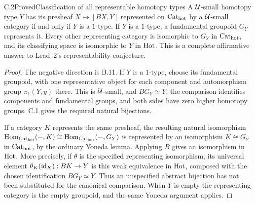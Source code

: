 \begin{claim}{C.2}{Proved}{Classification of all representable homotopy types}
A $\mathcal U$-small homotopy type $Y$ has its presheaf
$X\mapsto[BX,Y]$ represented on ${\mathrm{Cat}_{\mathrm{hot}}}$ by a $\mathcal U$-small category if
and only if $Y$ is a $1$-type.  If $Y$ is a $1$-type, a fundamental
groupoid $G_Y$ represents it.  Every other representing category is
isomorphic to $G_Y$ in ${\mathrm{Cat}_{\mathrm{hot}}}$, and its classifying space is
isomorphic to $Y$ in $\mathrm{Hot}$.  This is a complete affirmative answer to
Lead~2's representability conjecture.
\end{claim}
\begin{proof}
The negative direction is B.11.  If $Y$ is a $1$-type, choose its
fundamental groupoid, with one representative object for each component
and automorphism group $\pi_1(Y,y)$ there.  This is $\mathcal U$-small, and
$BG_Y\simeq Y$: the comparison identifies components and fundamental
groups, and both sides have zero higher homotopy groups.  C.1 gives
the required natural bijections.

If a category $K$ represents the same presheaf, the resulting natural
isomorphism
$\operatorname{Hom}_{{\mathrm{Cat}_{\mathrm{hot}}}}(-,K)\cong\operatorname{Hom}_{{\mathrm{Cat}_{\mathrm{hot}}}}(-,G_Y)$ is represented by an
isomorphism $K\cong G_Y$ in ${\mathrm{Cat}_{\mathrm{hot}}}$, by the ordinary Yoneda lemma.
Applying $B$ gives an isomorphism in $\mathrm{Hot}$.  More precisely, if
$\theta$ is the specified representing isomorphism, its universal
element $\theta_K(\mathrm{id}_K):BK\to Y$ is this weak equivalence in
$\mathrm{Hot}$, composed with the chosen identification $BG_Y\simeq Y$.
Thus an unspecified abstract bijection has not been substituted for the
canonical comparison.  When $Y$ is empty the representing category is
the empty groupoid, and the same Yoneda argument applies.
\end{proof}


